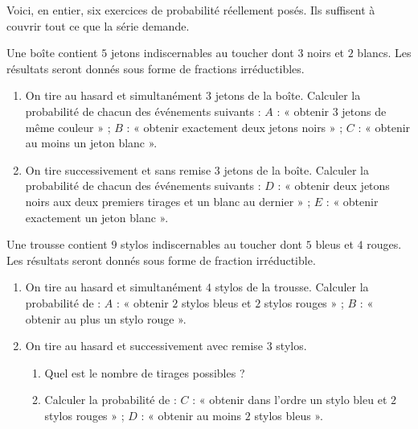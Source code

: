 \begin{annales}
Voici, en entier, six exercices de probabilité réellement posés. Ils
suffisent à couvrir tout ce que la série demande.

Une boîte contient $5$ jetons indiscernables au toucher dont $3$ noirs et
$2$ blancs. Les résultats seront donnés sous forme de fractions
irréductibles.
\begin{enumerate}[label=\textbf{\arabic*)}, leftmargin=*, itemsep=0.15em]
  \item On tire au hasard et simultanément $3$ jetons de la boîte. Calculer
        la probabilité de chacun des événements suivants :
        $A$ : « obtenir $3$ jetons de même couleur » ;
        $B$ : « obtenir exactement deux jetons noirs » ;
        $C$ : « obtenir au moins un jeton blanc ».
  \item On tire successivement et sans remise $3$ jetons de la boîte.
        Calculer la probabilité de chacun des événements suivants :
        $D$ : « obtenir deux jetons noirs aux deux premiers tirages et un
        blanc au dernier » ;
        $E$ : « obtenir exactement un jeton blanc ».
\end{enumerate}

Une trousse contient $9$ stylos indiscernables au toucher dont $5$ bleus et
$4$ rouges. Les résultats seront donnés sous forme de fraction
irréductible.
\begin{enumerate}[label=\textbf{\arabic*)}, leftmargin=*, itemsep=0.15em]
  \item On tire au hasard et simultanément $4$ stylos de la trousse.
        Calculer la probabilité de :
        $A$ : « obtenir $2$ stylos bleus et $2$ stylos rouges » ;
        $B$ : « obtenir au plus un stylo rouge ».
  \item On tire au hasard et successivement avec remise $3$ stylos.
        \begin{enumerate}[label=\textbf{\alph*)}, leftmargin=1.4em]
          \item Quel est le nombre de tirages possibles ?
          \item Calculer la probabilité de :
                $C$ : « obtenir dans l'ordre un stylo bleu et $2$ stylos
                rouges » ;
                $D$ : « obtenir au moins $2$ stylos bleus ».
        \end{enumerate}
\end{enumerate}


\end{annales}
